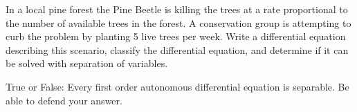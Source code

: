 \begin{problem}
    In a local pine forest the Pine Beetle is killing the trees at a rate proportional to the
    number of available trees in the forest.  A conservation group is attempting to curb the
    problem by planting 5 live trees per week.  Write a differential equation describing
    this scenario, classify the differential equation, and determine if it can be solved
    with separation of variables.
\end{problem}


\begin{problem}
    True or False: Every first order autonomous differential equation is separable. Be
    able to defend your answer.
\end{problem}


